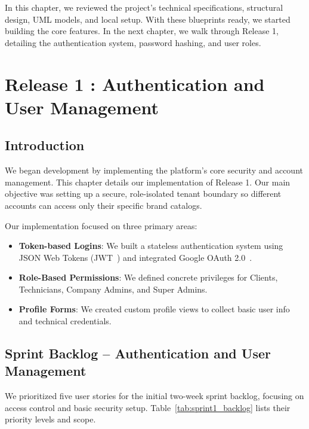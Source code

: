 \documentclass[12pt,a4paper]{report}
\begin{document}
In this chapter, we reviewed the project's technical specifications, structural design, UML models, and local setup. With these blueprints ready, we started building the core features. In the next chapter, we walk through Release 1, detailing the authentication system, password hashing, and user roles.

\chapter{Release 1 : Authentication and User Management}

\section{Introduction}

We began development by implementing the platform's core security and account management. This chapter details our implementation of Release 1. Our main objective was setting up a secure, role-isolated tenant boundary so different accounts can access only their specific brand catalogs.

Our implementation focused on three primary areas:
\begin{itemize}
    \item \textbf{Token-based Logins}: We built a stateless authentication system using JSON Web Tokens (JWT~\cite{jwt}) and integrated Google OAuth 2.0~\cite{oauth2}.
    \item \textbf{Role-Based Permissions}: We defined concrete privileges for Clients, Technicians, Company Admins, and Super Admins.
    \item \textbf{Profile Forms}: We created custom profile views to collect basic user info and technical credentials.
\end{itemize}

\section{Sprint Backlog -- Authentication and User Management}

We prioritized five user stories for the initial two-week sprint backlog, focusing on access control and basic security setup. Table~\ref{tab:sprint1_backlog} lists their priority levels and scope.

\renewcommand{\arraystretch}{1.3}
\setlength{\tabcolsep}{8pt}
\end{document}
